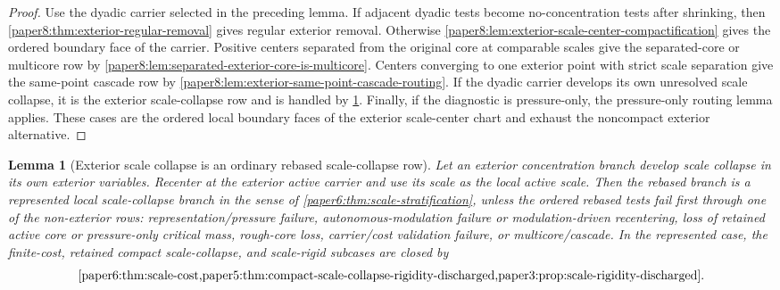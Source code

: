 \documentclass[11pt]{amsart}
\theoremstyle{plain}
\newtheorem{lemma}[lemma]{Lemma}
\theoremstyle{definition}
\theoremstyle{remark}
\begin{document}
\begin{proof}
Use the dyadic carrier selected in the preceding lemma.  If adjacent dyadic
tests become no-concentration tests after shrinking, then
\cref{paper8:thm:exterior-regular-removal} gives regular exterior removal.
Otherwise
\cref{paper8:lem:exterior-scale-center-compactification} gives the ordered
boundary face of the carrier.  Positive centers separated from the original core
at comparable scales give the separated-core or multicore row by
\cref{paper8:lem:separated-exterior-core-is-multicore}.  Centers converging to
one exterior point with strict scale separation give the same-point cascade row
by \cref{paper8:lem:exterior-same-point-cascade-routing}.  If the dyadic
carrier develops its own unresolved scale collapse, it is the exterior
scale-collapse row and is handled by
\cref{paper8:lem:exterior-scale-collapse-rebased}.  Finally, if the diagnostic
is pressure-only, the pressure-only routing lemma applies.  These cases are the
ordered local boundary faces of the exterior scale-center chart and exhaust the
noncompact exterior alternative.
\end{proof}

\begin{lemma}[Exterior scale collapse is an ordinary rebased scale-collapse row]
\label{paper8:lem:exterior-scale-collapse-rebased}
Let an exterior concentration branch develop scale collapse in its own exterior
variables.  Recenter at the exterior active carrier and use its scale as the
local active scale.  Then the rebased branch is a represented local
scale-collapse branch in the sense of
\cref{paper6:thm:scale-stratification}, unless the ordered rebased tests fail
first through one of the non-exterior rows: representation/pressure failure,
autonomous-modulation failure or modulation-driven recentering, loss of
retained active core or pressure-only critical mass, rough-core loss,
carrier/cost validation failure, or multicore/cascade.  In the represented
case, the finite-cost, retained compact scale-collapse, and scale-rigid
subcases are closed by
\[
  \cref{paper6:thm:scale-cost,paper5:thm:compact-scale-collapse-rigidity-discharged,paper3:prop:scale-rigidity-discharged}.
\]
\end{lemma}
\end{document}
